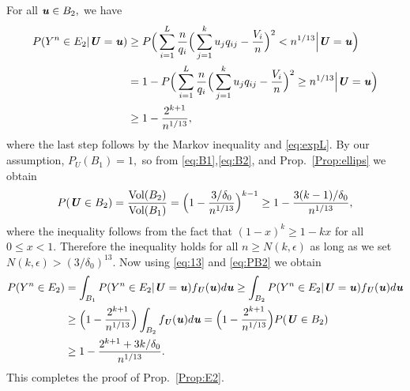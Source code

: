 \documentclass[11pt,onecolumn]{IEEEtran}
\def\mathbi#1{{\textbf{\textit #1}}}
\begin{document}
For all $\mathbi{u} \in B_2,$ we have
\begin{align}
P(Y^n\in E_2 | \mathbi{U}=\mathbi{u})
& \ge P \Big( \sum_{i=1}^L \frac{n}{q_i} \Big(\sum_{j=1}^k u_j q_{ij} - \frac{V_i}{n} \Big)^2
< n^{1/13} \Big| \mathbi{U}=\mathbi{u} \Big) \nonumber\\
& = 1 - P \Big( \sum_{i=1}^L \frac{n}{q_i} \Big(\sum_{j=1}^k u_j q_{ij} - \frac{V_i}{n} \Big)^2
\ge n^{1/13} \Big| \mathbi{U}=\mathbi{u} \Big) \nonumber\\
& \ge 1 - \frac{2^{k+1}}{n^{1/13}}, \label{eq:13}
\end{align}
where the last step follows by the Markov inequality and \eqref{eq:expL}.
By our assumption, $P_U(B_1)=1,$ so from \eqref{eq:B1},\eqref{eq:B2}, and Prop.~\ref{Prop:ellips} we obtain
  \begin{equation}\label{eq:PB2}
P(\mathbi{U}\in B_2) = \frac{\text{Vol}(B_2)}{\text{Vol}(B_1)}=\Big( 1 - \frac{3/\delta_0}{n^{1/13}} \Big)^{k-1} \ge 1 - \frac{3(k-1)/\delta_0}{n^{1/13}},
  \end{equation}
where the inequality follows from the fact that $(1-x)^k \ge 1-kx$ for all $0\le x < 1.$
Therefore the inequality holds for all $n\ge N(k,\epsilon)$ as long as we set 
$N(k,\epsilon)>(3/\delta_0)^{13}$.
Now using \eqref{eq:13} and \eqref{eq:PB2} we obtain
\begin{align*}
P(Y^n\in E_2) & = \int_{ B_1} 
P(Y^n\in E_2 | \mathbi{U}=\mathbi{u}) f_{\mathbi{U}}(\mathbi{u}) d \mathbi{u}
\ge \int_{ B_2} 
P(Y^n\in E_2 | \mathbi{U}=\mathbi{u}) f_{\mathbi{U}}(\mathbi{u}) d \mathbi{u} \\
& \ge \Big( 1 - \frac{2^{k+1}}{n^{1/13}} \Big) \int_{ B_2} 
 f_{\mathbi{U}}(\mathbi{u}) d \mathbi{u} = \Big( 1 - \frac{2^{k+1}}{n^{1/13}} \Big) P(\mathbi{U}\in B_2) \\
& \ge 1 - \frac{2^{k+1} + 3k/\delta_0}{n^{1/13}}.
\end{align*}
This completes the proof of Prop.~\ref{Prop:E2}.
\end{document}
